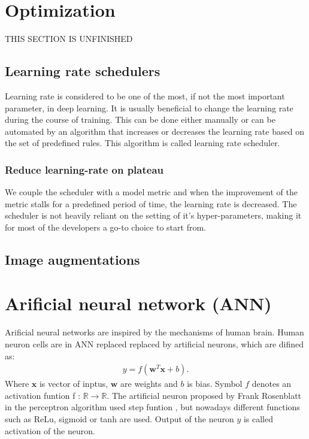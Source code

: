\section{Optimization}
THIS SECTION IS UNFINISHED
\subsection{Learning rate schedulers}
Learning rate is considered to be one of the most, if not the most important parameter, in deep learning. It is usually beneficial to change the learning rate during the course of training. This can be done either manually or can be automated by an algorithm that increases or decreases the learning rate based on the set of predefined rules. This algorithm is called learning rate scheduler.

\subsubsection{Reduce learning-rate on plateau}
We couple the scheduler with a model metric and when the improvement of the metric stalls for a predefined period of time, the learning rate is decreased.
The scheduler is not heavily reliant on the setting of it's hyper-parameters, making it for most of the developers a go-to choice to start from.

\subsection{Image augmentations}


\section{Arificial neural network (ANN)}
Arificial neural networks are inspired by the mechanisms of human brain. Human neuron cells are in ANN replaced replaced by artificial neurons, which are difined as:
\begin{align}
    y = f \left( \boldsymbol{w}^T \boldsymbol{x}  + b \right).
\end{align}
Where $\boldsymbol{x}$ is vector of inptus, $\boldsymbol{w}$ are weights and $b$ is bias. Symbol $f$ denotes an activation funtion f : $\mathbb{R} \rightarrow \mathbb{R}$. The artificial neuron proposed by Frank Rosenblatt in the perceptron algorithm used step funtion \cite{Rosenblatt1958}, but nowadays different functions such as ReLu, sigmoid or tanh are used. Output of the neuron $y$ is called activation of the neuron.

